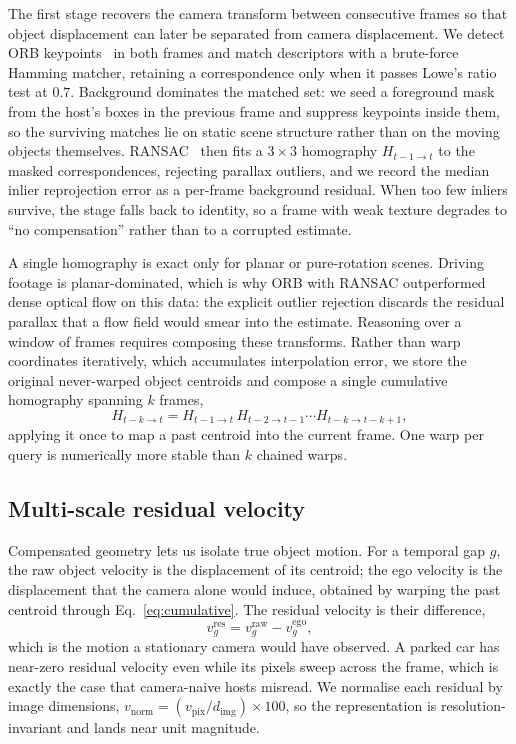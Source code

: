 \documentclass[sigconf,review,anonymous]{acmart}
\begin{document}
The first stage recovers the camera transform between consecutive frames so that object displacement can later be separated from camera displacement. We detect ORB keypoints~\cite{orb} in both frames and match descriptors with a brute-force Hamming matcher, retaining a correspondence only when it passes Lowe's ratio test at $0.7$. Background dominates the matched set: we seed a foreground mask from the host's boxes in the previous frame and suppress keypoints inside them, so the surviving matches lie on static scene structure rather than on the moving objects themselves. RANSAC~\cite{ransac} then fits a $3\times3$ homography $H_{t-1\to t}$ to the masked correspondences, rejecting parallax outliers, and we record the median inlier reprojection error as a per-frame background residual. When too few inliers survive, the stage falls back to identity, so a frame with weak texture degrades to ``no compensation'' rather than to a corrupted estimate.

A single homography is exact only for planar or pure-rotation scenes. Driving footage is planar-dominated, which is why ORB with RANSAC outperformed dense optical flow on this data: the explicit outlier rejection discards the residual parallax that a flow field would smear into the estimate. Reasoning over a window of frames requires composing these transforms. Rather than warp coordinates iteratively, which accumulates interpolation error, we store the original never-warped object centroids and compose a single cumulative homography spanning $k$ frames,
\begin{equation}
H_{t-k\to t} = H_{t-1\to t}\, H_{t-2\to t-1} \cdots H_{t-k\to t-k+1},
\label{eq:cumulative}
\end{equation}
applying it once to map a past centroid into the current frame. One warp per query is numerically more stable than $k$ chained warps.

\subsection{Multi-scale residual velocity}
\label{sec:residual}

Compensated geometry lets us isolate true object motion. For a temporal gap $g$, the raw object velocity is the displacement of its centroid; the ego velocity is the displacement that the camera alone would induce, obtained by warping the past centroid through Eq.~\ref{eq:cumulative}. The residual velocity is their difference,
\begin{equation}
v^{\mathrm{res}}_{g} = v^{\mathrm{raw}}_{g} - v^{\mathrm{ego}}_{g},
\label{eq:residual}
\end{equation}
which is the motion a stationary camera would have observed. A parked car has near-zero residual velocity even while its pixels sweep across the frame, which is exactly the case that camera-naive hosts misread. We normalise each residual by image dimensions, $v_{\mathrm{norm}} = (v_{\mathrm{pix}}/d_{\mathrm{img}})\times 100$, so the representation is resolution-invariant and lands near unit magnitude.
\end{document}
